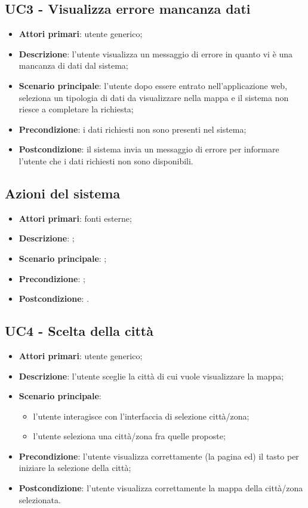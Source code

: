 \subsection{UC3 - Visualizza errore mancanza dati}
\begin{itemize}
	\item \textbf{Attori primari}: utente generico;
	\item \textbf{Descrizione}: l'utente visualizza un messaggio di errore in quanto vi è una mancanza di dati dal sistema;
	\item \textbf{Scenario principale}: l'utente dopo essere entrato nell'applicazione web, seleziona un tipologia di dati da visualizzare nella mappa e il sistema non riesce a completare la richiesta;
	\item \textbf{Precondizione}: i dati richiesti non sono presenti nel sistema;
	\item \textbf{Postcondizione}: il sistema invia un messaggio di errore per informare l'utente che i dati richiesti non sono disponibili.
\end{itemize}

\subsection{Azioni del sistema}
\begin{itemize}
\item \textbf{Attori primari}: fonti esterne;
\item \textbf{Descrizione}: ;
\item \textbf{Scenario principale}: ;
\item \textbf{Precondizione}: ;
\item \textbf{Postcondizione}: .
\end{itemize}

\subsection{UC4 - Scelta della città}
\begin{itemize}
\item \textbf{Attori primari}: utente generico;
\item \textbf{Descrizione}: l’utente sceglie la città di cui vuole visualizzare la mappa;
\item \textbf{Scenario principale}:
	\begin{itemize}
		\item l’utente interagisce con l’interfaccia di selezione città/zona;
		\item l’utente seleziona una città/zona fra quelle proposte;
	\end{itemize}
\item \textbf{Precondizione}: l’utente visualizza correttamente (la pagina ed) il tasto per iniziare la selezione della città;
\item \textbf{Postcondizione}:  l’utente visualizza correttamente la mappa della città/zona selezionata.
\end{itemize}

